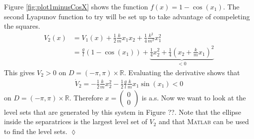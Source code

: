 \begin{example}
Figure \ref{fig:plot1minusCosX} shows the function $f(x) = 1-\cos(x_1)$. The second Lyapunov function to try will be set up to take advantage of compeleting the squares.
\begin{align*}
V_2(x) &= V_1(x) + \tfrac{1}{2}\tfrac{k}{m}x_1x_2 + \tfrac{1}{4}\tfrac{k^2}{m^2}x_1^2 \\
&= \tfrac{g}{l}(1-\cos(x_1)) + \underbrace{\tfrac{1}{4}x_2^2 + \tfrac{1}{4}(x_2+\tfrac{k}{m}x_1)^2}_{<0}
\end{align*}
This gives $V_2>0$ on $D=(-\pi,\pi)\times\mathbb{R}$. Evaluating the derivative shows that
\begin{align*}
\dot{V}_2 = -\tfrac{1}{2}\tfrac{k}{m}x_2^2 - \tfrac{1}{2}\tfrac{g}{l}\tfrac{k}{m}x_1\sin(x_1) < 0
\end{align*}
on $D=(-\pi,\pi)\times\mathbb{R}$. Therefore $x=\left(\begin{array}{c} 0 \\ 0 \end{array}\right)$ is a.s. Now we want to look at the level sets that are generated by this system in Figure ??. Note that the ellipse inside the separatrices is the largest level set of $V_2$ and that \textsc{Matlab} can be used to find the level sets.
$\lozenge$
\end{example}

